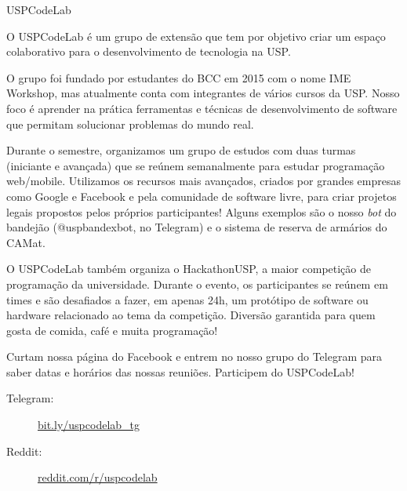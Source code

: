 \begin{subsecao}{USPCodeLab}


O USPCodeLab é um grupo de extensão que tem por objetivo criar um espaço
colaborativo para o desenvolvimento de tecnologia na USP.

O grupo foi fundado por estudantes do BCC em 2015 com o nome IME Workshop, mas
atualmente conta com integrantes de vários cursos da USP. Nosso foco é aprender
na prática ferramentas e técnicas de desenvolvimento de software que permitam
solucionar problemas do mundo real.

Durante o semestre, organizamos um grupo de estudos com duas turmas (iniciante
e avançada) que se reúnem semanalmente para estudar programação web/mobile.
Utilizamos os recursos mais avançados, criados por grandes empresas como Google
e Facebook e pela comunidade de software livre, para criar projetos legais
propostos pelos próprios participantes! Alguns exemplos são o nosso \textit{bot}
do bandejão (@uspbandexbot, no Telegram) e o sistema de reserva de armários do
CAMat.

O USPCodeLab também organiza o HackathonUSP, a maior competição de programação
da universidade. Durante o evento, os participantes se reúnem em times e são
desafiados a fazer, em apenas 24h, um protótipo de software ou hardware
relacionado ao tema da competição. Diversão garantida para quem gosta de comida,
café e muita programação!

Curtam nossa página do Facebook e entrem no nosso grupo do Telegram para saber
datas e horários das nossas reuniões. Participem do USPCodeLab!

\begin{description}
\item[Telegram:] \url{bit.ly/uspcodelab_tg}
\item[Reddit:] \url{reddit.com/r/uspcodelab}
\end{description}

\end{subsecao}
